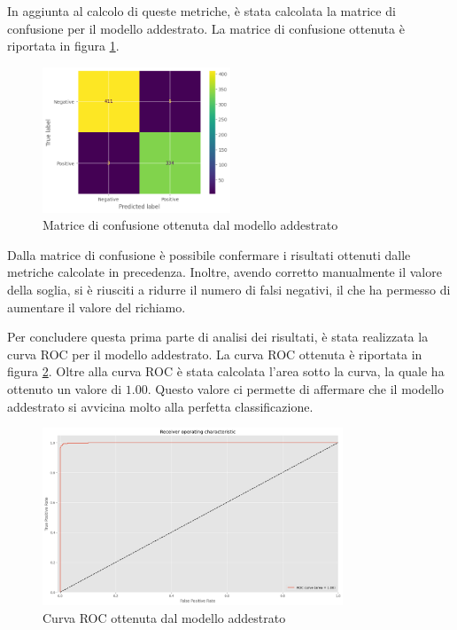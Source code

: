 In aggiunta al calcolo di queste metriche, è stata calcolata la matrice di confusione
per il modello addestrato. La matrice di confusione ottenuta è riportata in figura
\ref{fig:matriceConfusioneReteNeurale}.

\begin{figure}[!ht]
    \centering
    \includegraphics[width=0.5\textwidth]{img/rete/matrice_confusione.png}
    \caption{Matrice di confusione ottenuta dal modello addestrato}
    \label{fig:matriceConfusioneReteNeurale}
\end{figure}

Dalla matrice di confusione è possibile confermare i risultati ottenuti dalle
metriche calcolate in precedenza. Inoltre, avendo corretto manualmente il valore
della soglia, si è riusciti a ridurre il numero di falsi negativi, il che ha
permesso di aumentare il valore del richiamo.

Per concludere questa prima parte di analisi dei risultati, è stata realizzata
la curva ROC per il modello addestrato. La curva ROC ottenuta è riportata in
figura \ref{fig:curvaRocReteNeurale}. Oltre alla curva ROC è stata calcolata
l'area sotto la curva, la quale ha ottenuto un valore di $1.00$. Questo valore
ci permette di affermare che il modello addestrato si avvicina molto alla
perfetta classificazione.

\begin{figure}[!ht]
    \centering
    \includegraphics[width=0.8\textwidth]{img/rete/curva_roc.png}
    \caption{Curva ROC ottenuta dal modello addestrato}
    \label{fig:curvaRocReteNeurale}
\end{figure}
